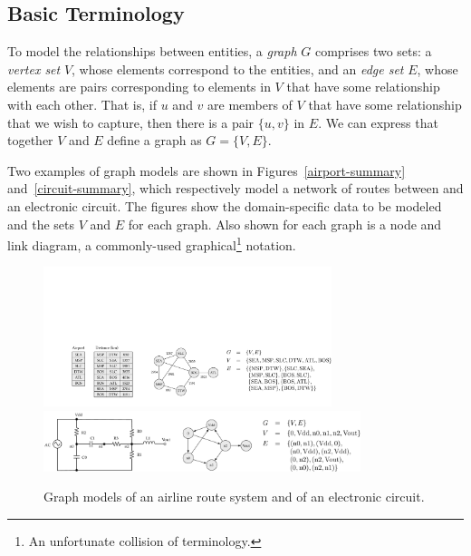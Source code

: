 \subsection{Basic Terminology}

To model the relationships between entities, a \emph{graph} $G$ comprises two sets:
a \emph{vertex set} $V$, whose elements correspond to the entities, and an \emph{edge set} $E$, whose
elements are pairs corresponding to elements in $V$ that have some relationship with each other.  That is,
if $u$ and $v$ are members of $V$ that have some relationship that we wish to capture, then there is
a pair $\{u, v\}$ in $E$.  We can express that together $V$ and $E$ define a graph as $G=\{V, E\}$.

Two examples of graph models are shown in Figures~\ref{airport-summary} and~\ref{circuit-summary},
which respectively model a network of routes between and an electronic circuit.  
The figures show the domain-specific data to be modeled and the sets $V$ and $E$ for each graph.
Also shown for each graph is a
 node and link diagram, a commonly-used graphical\footnote{An unfortunate collision of terminology.}
notation.

\begin{figure}[ht]
  \begin{center}
    {\includegraphics[width=0.75\textwidth]{figs/airport-summary.pdf}}
    \\
    {\includegraphics[width=0.825\textwidth]{figs/circuit-summary.pdf}}
    \caption{Graph models of an airline route system and of an electronic circuit.\label{fig:node_link_graphs}}
  \end{center}
\end{figure}


